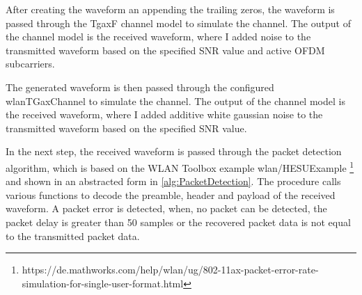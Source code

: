 After creating the waveform an appending the trailing zeros, the waveform is passed through the TgaxF channel model to simulate the channel.
The output of the channel model is the received waveform, where I added noise to the transmitted waveform based on the
specified \ac{SNR} value and active \ac{OFDM} subcarriers.

The generated waveform is then passed through the configured wlanTGaxChannel to simulate the channel. The output of the channel model is the received waveform, where
I added additive white gaussian noise to the transmitted waveform based on the specified \ac{SNR} value.

In the next step, the received waveform is passed through the packet detection algorithm, which is based on the
WLAN Toolbox example wlan/HESUExample \footnote{https://de.mathworks.com/help/wlan/ug/802-11ax-packet-error-rate-simulation-for-single-user-format.html} and
shown in an abstracted form in \autoref{alg:PacketDetection}. The procedure calls various functions to decode the preamble, header and payload of
the received waveform. A packet error is detected, when, no packet can be detected, the packet delay is greater than \num{50} samples or the recovered packet data
is not equal to the transmitted packet data.

